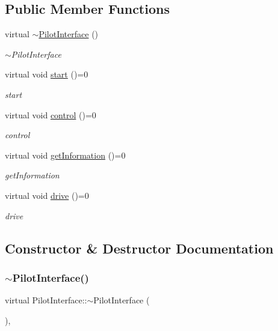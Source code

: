 \subsection*{Public Member Functions}
\begin{DoxyCompactItemize}
\item 
virtual \hyperlink{classPilotInterface_a05a84532207fc97e9caa6caa09be1d44}{$\sim$\+Pilot\+Interface} ()
\begin{DoxyCompactList}\small\item\em $\sim$\+Pilot\+Interface \end{DoxyCompactList}\item 
virtual void \hyperlink{classPilotInterface_a86f3a427525364eb977fbe0a032fb9f7}{start} ()=0
\begin{DoxyCompactList}\small\item\em start \end{DoxyCompactList}\item 
virtual void \hyperlink{classPilotInterface_a8847bf56785f024f6168e7c57bbb78dc}{control} ()=0
\begin{DoxyCompactList}\small\item\em control \end{DoxyCompactList}\item 
virtual void \hyperlink{classPilotInterface_a8f328815397986cc26fc8baa2bb538e2}{get\+Information} ()=0
\begin{DoxyCompactList}\small\item\em get\+Information \end{DoxyCompactList}\item 
virtual void \hyperlink{classPilotInterface_a73569195611ac3b77b85b8c3a317b1cf}{drive} ()=0
\begin{DoxyCompactList}\small\item\em drive \end{DoxyCompactList}\end{DoxyCompactItemize}


\subsection{Constructor \& Destructor Documentation}
\mbox{\label{classPilotInterface_a05a84532207fc97e9caa6caa09be1d44}} 
\subsubsection{\texorpdfstring{$\sim$\+Pilot\+Interface()}{~PilotInterface()}}
{\footnotesize\ttfamily virtual Pilot\+Interface\+::$\sim$\+Pilot\+Interface (\begin{DoxyParamCaption}{ }\end{DoxyParamCaption})\hspace{0.3cm}{\ttfamily [inline]}, {\ttfamily [virtual]}}




